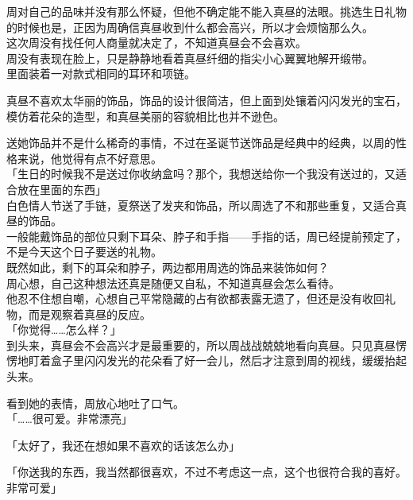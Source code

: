 周对自己的品味并没有那么怀疑，但他不确定能不能入真昼的法眼。挑选生日礼物的时候也是，正因为周确信真昼收到什么都会高兴，所以才会烦恼那么久。\\

这次周没有找任何人商量就决定了，不知道真昼会不会喜欢。\\

周没有表现在脸上，只是静静地看着真昼纤细的指尖小心翼翼地解开缎带。\\

里面装着一对款式相同的耳环和项链。

真昼不喜欢太华丽的饰品，饰品的设计很简洁，但上面到处镶着闪闪发光的宝石，模仿着花朵的造型，和真昼美丽的容貌相比也并不逊色。

送她饰品并不是什么稀奇的事情，不过在圣诞节送饰品是经典中的经典，以周的性格来说，他觉得有点不好意思。\\

「生日的时候我不是送过你收纳盒吗？那个，我想送给你一个我没有送过的，又适合放在里面的东西」\\

白色情人节送了手链，夏祭送了发夹和饰品，所以周选了不和那些重复，又适合真昼的饰品。\\

一般能戴饰品的部位只剩下耳朵、脖子和手指——手指的话，周已经提前预定了，不是今天这个日子要送的礼物。\\

既然如此，剩下的耳朵和脖子，两边都用周选的饰品来装饰如何？\\

周心想，自己这种想法还真是随便又自私，不知道真昼会怎么看待。\\

他忍不住想自嘲，心想自己平常隐藏的占有欲都表露无遗了，但还是没有收回礼物，而是观察着真昼的反应。\\

「你觉得……怎么样？」\\

到头来，真昼会不会高兴才是最重要的，所以周战战兢兢地看向真昼。只见真昼愣愣地盯着盒子里闪闪发光的花朵看了好一会儿，然后才注意到周的视线，缓缓抬起头来。

看到她的表情，周放心地吐了口气。\\

「……很可爱。非常漂亮」

「太好了，我还在想如果不喜欢的话该怎么办」

「你送我的东西，我当然都很喜欢，不过不考虑这一点，这个也很符合我的喜好。非常可爱」


